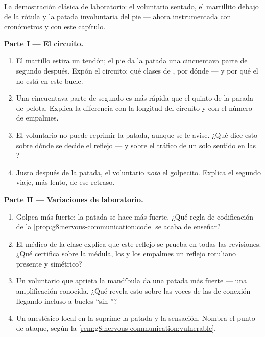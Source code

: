 \begin{problem}\label{pb:g8:nervous-communication:1}
La demostración clásica de laboratorio: el voluntario sentado, el
martillito debajo de la rótula y la patada involuntaria del pie ---
ahora instrumentada con cronómetros y con este capítulo.

\medskip\noindent\textbf{Parte I --- El circuito.}
\begin{enumerate}
  \item El martillo estira un tendón; el pie da la patada una
        cincuentava parte de segundo después. Expón el circuito: qué
        clases de , por dónde --- y por qué el  no está
        en este bucle.
  \item Una cincuentava parte de segundo es más rápida que el quinto de
        la parada de pelota. Explica la diferencia con la longitud del
        circuito y con el número de empalmes.
  \item El voluntario no puede reprimir la patada, aunque se le avise.
        ¿Qué dice esto sobre dónde se decide el reflejo --- y sobre el
        tráfico de un solo sentido en las ?
  \item Justo después de la patada, el voluntario \emph{nota} el
        golpecito. Explica el segundo viaje, más lento, de ese retraso.
\end{enumerate}

\medskip\noindent\textbf{Parte II --- Variaciones de laboratorio.}
\begin{enumerate}[resume]
  \item Golpea más fuerte: la patada se hace más fuerte. ¿Qué regla de
        codificación de la \cref{prop:g8:nervous-communication:code} se
        acaba de enseñar?
  \item El médico de la clase explica que este reflejo se prueba en
        todas las revisiones. ¿Qué certifica sobre la médula, los
         y los empalmes un reflejo rotuliano presente y
        simétrico?
  \item Un voluntario que aprieta la mandíbula da una patada más fuerte
        --- una amplificación conocida. ¿Qué revela esto sobre las
        voces de las  de conexión llegando incluso a bucles
        ``sin ''?
  \item Un anestésico local en la  suprime la patada y la
        sensación. Nombra el punto de ataque, según la
        \cref{rem:g8:nervous-communication:vulnerable}.
\end{enumerate}


\end{problem}
